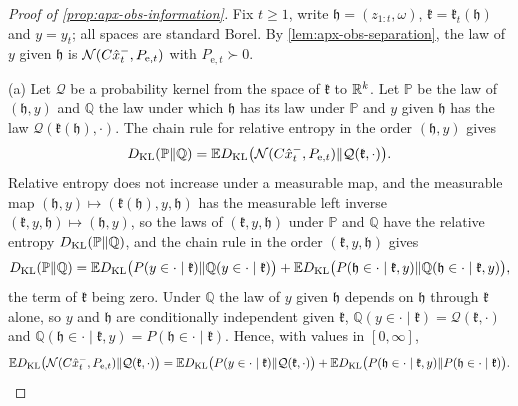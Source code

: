 \begin{proof}[Proof of \cref{prop:apx-obs-information}]
Fix $t\ge1$, write $\mathfrak h=(z_{1:t},\omega)$, $\mathfrak k=\mathfrak k_t(\mathfrak h)$ and $y=y_t$; all spaces are standard Borel. By \cref{lem:apx-obs-separation}, the law of $y$ given $\mathfrak h$ is $\mathcal{N}(C\hat x^-_t,P_{\mathrm e,t})$ with $P_{\mathrm e,t}\succ0$.

(a) Let $\mathcal Q$ be a probability kernel from the space of $\mathfrak k$ to $\mathbb{R}^k$. Let $\mathbb P$ be the law of $(\mathfrak h,y)$ and $\mathbb Q$ the law under which $\mathfrak h$ has its law under $\mathbb P$ and $y$ given $\mathfrak h$ has the law $\mathcal Q(\mathfrak k(\mathfrak h),\cdot)$. The chain rule for relative entropy in the order $(\mathfrak h,y)$ gives
\begin{equation*}
D_{\mathrm{KL}}(\mathbb P\Vert\mathbb Q)=\mathbb{E}D_{\mathrm{KL}}\bigl(\mathcal{N}(C\hat x^-_t,P_{\mathrm e,t})\Vert\mathcal Q(\mathfrak k,\cdot)\bigr).
\end{equation*}
Relative entropy does not increase under a measurable map, and the measurable map $(\mathfrak h,y)\mapsto(\mathfrak k(\mathfrak h),y,\mathfrak h)$ has the measurable left inverse $(\mathfrak k,y,\mathfrak h)\mapsto(\mathfrak h,y)$, so the laws of $(\mathfrak k,y,\mathfrak h)$ under $\mathbb P$ and $\mathbb Q$ have the relative entropy $D_{\mathrm{KL}}(\mathbb P\Vert\mathbb Q)$, and the chain rule in the order $(\mathfrak k,y,\mathfrak h)$ gives
\begin{equation*}
D_{\mathrm{KL}}(\mathbb P\Vert\mathbb Q)=\mathbb{E}D_{\mathrm{KL}}\bigl(P(y\in\cdot\mid\mathfrak k)\Vert\mathbb Q(y\in\cdot\mid\mathfrak k)\bigr)+\mathbb{E}D_{\mathrm{KL}}\bigl(P(\mathfrak h\in\cdot\mid\mathfrak k,y)\Vert\mathbb Q(\mathfrak h\in\cdot\mid\mathfrak k,y)\bigr),
\end{equation*}
the term of $\mathfrak k$ being zero. Under $\mathbb Q$ the law of $y$ given $\mathfrak h$ depends on $\mathfrak h$ through $\mathfrak k$ alone, so $y$ and $\mathfrak h$ are conditionally independent given $\mathfrak k$, $\mathbb Q(y\in\cdot\mid\mathfrak k)=\mathcal Q(\mathfrak k,\cdot)$ and $\mathbb Q(\mathfrak h\in\cdot\mid\mathfrak k,y)=P(\mathfrak h\in\cdot\mid\mathfrak k)$. Hence, with values in $[0,\infty]$,
\begin{equation}\label{eq:apx-obs-compensation}
\mathbb{E}D_{\mathrm{KL}}\bigl(\mathcal{N}(C\hat x^-_t,P_{\mathrm e,t})\Vert\mathcal Q(\mathfrak k,\cdot)\bigr)=\mathbb{E}D_{\mathrm{KL}}\bigl(P(y\in\cdot\mid\mathfrak k)\Vert\mathcal Q(\mathfrak k,\cdot)\bigr)+\mathbb{E}D_{\mathrm{KL}}\bigl(P(\mathfrak h\in\cdot\mid\mathfrak k,y)\Vert P(\mathfrak h\in\cdot\mid\mathfrak k)\bigr).
\end{equation}

\end{proof}
